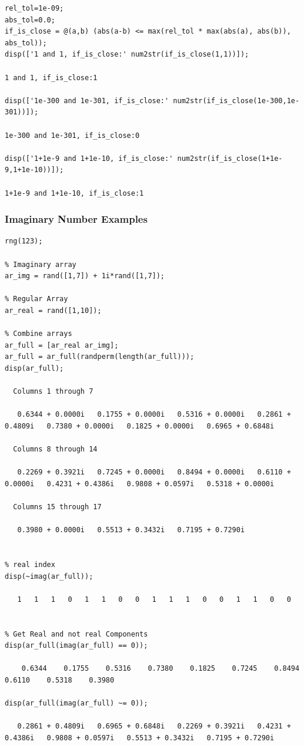 \documentclass[
]{book}
\begin{document}
\begin{verbatim}
rel_tol=1e-09;
abs_tol=0.0;
if_is_close = @(a,b) (abs(a-b) <= max(rel_tol * max(abs(a), abs(b)), abs_tol));
disp(['1 and 1, if_is_close:' num2str(if_is_close(1,1))]);

1 and 1, if_is_close:1

disp(['1e-300 and 1e-301, if_is_close:' num2str(if_is_close(1e-300,1e-301))]);

1e-300 and 1e-301, if_is_close:0

disp(['1+1e-9 and 1+1e-10, if_is_close:' num2str(if_is_close(1+1e-9,1+1e-10))]);

1+1e-9 and 1+1e-10, if_is_close:1
\end{verbatim}

\hypertarget{imaginary-number-examples}{%
\subsubsection{Imaginary Number Examples}\label{imaginary-number-examples}}

\begin{verbatim}
rng(123);

% Imaginary array
ar_img = rand([1,7]) + 1i*rand([1,7]);

% Regular Array
ar_real = rand([1,10]);

% Combine arrays
ar_full = [ar_real ar_img];
ar_full = ar_full(randperm(length(ar_full)));
disp(ar_full);

  Columns 1 through 7

   0.6344 + 0.0000i   0.1755 + 0.0000i   0.5316 + 0.0000i   0.2861 + 0.4809i   0.7380 + 0.0000i   0.1825 + 0.0000i   0.6965 + 0.6848i

  Columns 8 through 14

   0.2269 + 0.3921i   0.7245 + 0.0000i   0.8494 + 0.0000i   0.6110 + 0.0000i   0.4231 + 0.4386i   0.9808 + 0.0597i   0.5318 + 0.0000i

  Columns 15 through 17

   0.3980 + 0.0000i   0.5513 + 0.3432i   0.7195 + 0.7290i


% real index
disp(~imag(ar_full));

   1   1   1   0   1   1   0   0   1   1   1   0   0   1   1   0   0


% Get Real and not real Components
disp(ar_full(imag(ar_full) == 0));

    0.6344    0.1755    0.5316    0.7380    0.1825    0.7245    0.8494    0.6110    0.5318    0.3980

disp(ar_full(imag(ar_full) ~= 0));

   0.2861 + 0.4809i   0.6965 + 0.6848i   0.2269 + 0.3921i   0.4231 + 0.4386i   0.9808 + 0.0597i   0.5513 + 0.3432i   0.7195 + 0.7290i
\end{verbatim}
\end{document}
